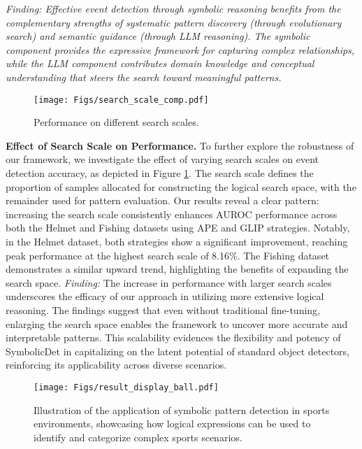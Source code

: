 \textit{Finding: Effective event detection through symbolic reasoning benefits from the complementary strengths of systematic pattern discovery (through evolutionary search) and semantic guidance (through LLM reasoning). The symbolic component provides the expressive framework for capturing complex relationships, while the LLM component contributes domain knowledge and conceptual understanding that steers the search toward meaningful patterns.} \par
% 
\begin{figure}[!t]
    \centering
    \setlength{\abovecaptionskip}{0.1cm}
    \texttt{[image: Figs/search\_scale\_comp.pdf]}
    \caption{Performance on different search scales.}
    \label{fig:search_scale}
    \vspace{-0.5cm}
\end{figure}
% 
\noindent
\textbf{Effect of Search Scale on Performance.} To further explore the robustness of our framework, we investigate the effect of varying search scales on event detection accuracy, as depicted in Figure \ref{fig:search_scale}. The search scale defines the proportion of samples allocated for constructing the logical search space, with the remainder used for pattern evaluation.
Our results reveal a clear pattern: increasing the search scale consistently enhances AUROC performance across both the Helmet and Fishing datasets using APE and GLIP strategies. Notably, in the Helmet dataset, both strategies show a significant improvement, reaching peak performance at the highest search scale of 8.16\%. The Fishing dataset demonstrates a similar upward trend, highlighting the benefits of expanding the search space.
\textit{Finding:} The increase in performance with larger search scales underscores the efficacy of our approach in utilizing more extensive logical reasoning. The findings suggest that even without traditional fine-tuning, enlarging the search space enables the framework to uncover more accurate and interpretable patterns. This scalability evidences the flexibility and potency of SymbolicDet in capitalizing on the latent potential of standard object detectors, reinforcing its applicability across diverse scenarios.
% 
\begin{figure*}[t!]
    \centering
    \setlength{\abovecaptionskip}{0.1cm}
    \texttt{[image: Figs/result\_display\_ball.pdf]}
    \caption{Illustration of the application of symbolic pattern detection in sports environments, showcasing how logical expressions can be used to identify and categorize complex sports scenarios.}
    \label{fig:tutorial}
    \vspace{-0.5cm}
\end{figure*}